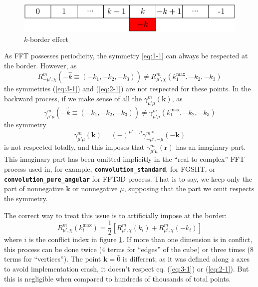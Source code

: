 \begin{figure}[h]
\begin{centering}
\includegraphics{_figure/k-border}
\par\end{centering}
\caption{$k$-border effect\label{fig:k-border-effect}}
\end{figure}

As \acs{FFT} possesses periodicity, the symmetry \ref{eq:1-1} can
always be respected at the border. However, as
\begin{equation}
R_{-\mu',\chi}^{m}(-\hat{k}\equiv(-k_{1},-k_{2},-k_{3}))\neq R_{\mu',\chi}^{m}(k_{1}^{\mathrm{max}},-k_{2},-k_{3})
\end{equation}
the symmetries (\ref{eq:3-1}) and (\ref{eq:2-1}) are not respected
for these points. In the backward process, if we make sense of all
the $\gamma_{\mu'\mu}^{m}(\mathbf{k})$, as
\[
\gamma_{\mu'\mu}^{m}(-\hat{k}\equiv(-k_{1},-k_{2},-k_{3}))\neq\gamma_{\mu'\mu}^{m}(k_{1}^{\mathrm{max}},-k_{2},-k_{3})
\]
the symmetry
\begin{equation}
\gamma_{\mu'\mu}^{m}(\mathbf{k})=(-)^{\mu'+\mu}\gamma_{-\mu',-\mu}^{m*}(-\mathbf{k})\label{eq:1-1}
\end{equation}
is not respected totally, and this imposes that $\gamma_{\mu'\mu}^{m}(\mathbf{r})$
has an imaginary part. This imaginary part has been omitted implicitly
in the ``real to complex'' \acs{FFT} process used in, for example,
\texttt{\textbf{convolution\_standard}}, for \acs{FGSHT}, or \texttt{\textbf{convolution\_pure\_angular}}
for FFT3D process. That is to say, we keep only the part of nonnegative
$\mathbf{k}$ or nonnegative $\mu$, supposing that the part we
omit respects the symmetry.

The correct way to treat this issue is to artificially impose at the
border:
\begin{equation}
R_{\mu',\chi}^{m}(k_{i}^{\mathrm{max}})=\frac{1}{2}\left[R_{\mu',\chi}^{m}(k_{i})+R_{\mu',\chi}^{m}(-k_{i})\right]
\end{equation}
where $i$ is the conflict index in figure \ref{fig:k-border-effect}.
If more than one dimension is in conflict, this process can be done
twice (4 terms for ``edges'' of the cube) or three times (8 terms
for ``vertices''). The point $\mathbf{k}=\hat{0}$ is different;
as it was defined along $z$ axes to avoid implementation crash, it
doesn't respect eq. (\ref{eq:3-1}) or (\ref{eq:2-1}). But
this is negligible when compared to hundreds of thousands of total points.

